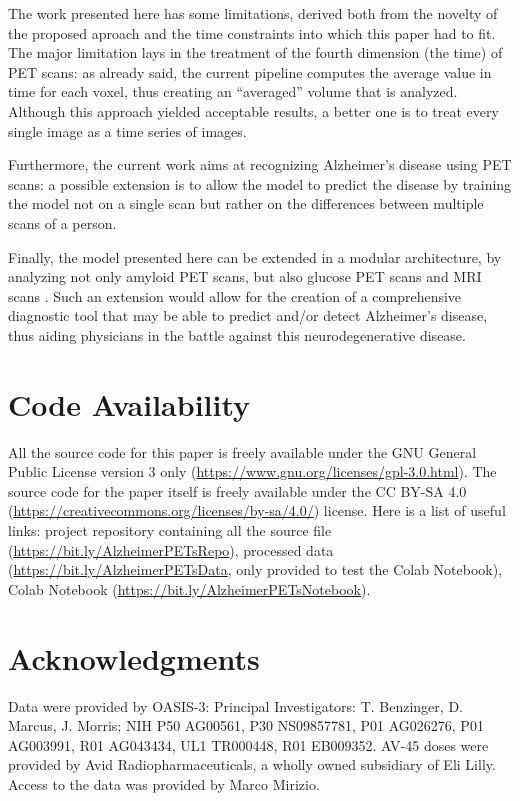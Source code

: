 \documentclass[10pt,twocolumn,letterpaper]{article}
\begin{document}
The work presented here has some limitations, derived both from the novelty of
the proposed aproach and the time constraints into which this paper had to fit.
The major limitation lays in the treatment of the fourth dimension (the time) of
PET scans: as already said, the current pipeline computes the average value in
time for each voxel, thus creating an ``averaged'' volume that is analyzed.
Although this approach yielded acceptable results, a better one is to treat
every single image as a time series of images.

Furthermore, the current work aims at recognizing Alzheimer's disease using PET
scans: a possible extension is to allow the model to predict the disease by
training the model not on a single scan but rather on the differences between
multiple scans of a person.

Finally, the model presented here can be extended in a modular architecture, by
analyzing not only amyloid PET scans, but also glucose PET scans
\cite{Chetelat2020} and MRI scans \cite{Altay2020}. Such an extension would
allow for the creation of a comprehensive diagnostic tool that may be able to
predict and/or detect Alzheimer's disease, thus aiding physicians in the battle
against this neurodegenerative disease.

\section*{Code Availability}
\label{sec:code-availability}

All the source code for this paper is freely available under the GNU General
Public License version 3 only (\url{https://www.gnu.org/licenses/gpl-3.0.html}).
The source code for the paper itself is freely available under the CC BY-SA 4.0
(\url{https://creativecommons.org/licenses/by-sa/4.0/}) license. Here is a list
of useful links: project repository containing all the source file
(\url{https://bit.ly/AlzheimerPETsRepo}), processed data
(\url{https://bit.ly/AlzheimerPETsData}, only provided to test the Colab
Notebook), Colab Notebook (\url{https://bit.ly/AlzheimerPETsNotebook}).

\section*{Acknowledgments}
\label{sec:aknowledgments}

Data were provided by OASIS-3: Principal Investigators: T. Benzinger, D. Marcus,
J. Morris; NIH P50 AG00561, P30 NS09857781, P01 AG026276, P01 AG003991, R01
AG043434, UL1 TR000448, R01 EB009352. AV-45 doses were provided by Avid
Radiopharmaceuticals, a wholly owned subsidiary of Eli Lilly. Access to the data
was provided by Marco Mirizio.

{\small


}
\end{document}
